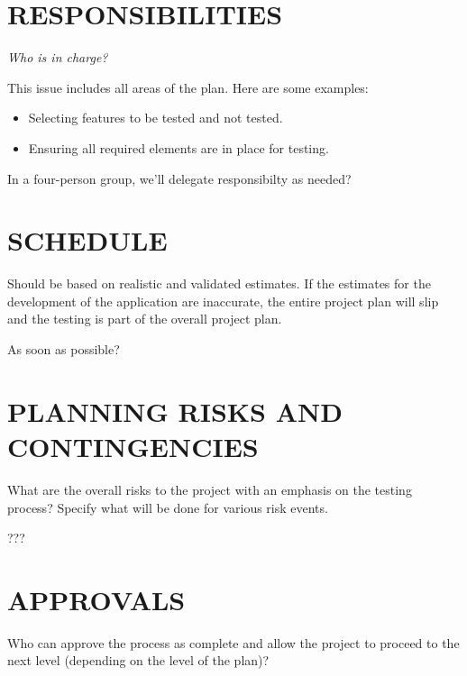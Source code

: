 \section[RESPONSIBILITIES]{\bfseries\color{black} RESPONSIBILITIES}
{\itshape\color{black}
Who is in charge?

This issue includes all areas of the plan. Here are some examples:

\begin{itemize}
\item Selecting features to be tested and not tested.
\item Ensuring all required elements are in place for testing. 
\end{itemize}
}
{\color{black}

  In a four-person group, we'll delegate responsibilty as needed?

}

\section[SCHEDULE]{\bfseries\color{black} SCHEDULE}
{\itshape\color{black}

Should be based on realistic and validated estimates. If the estimates
for the development of the application are inaccurate, the entire
project plan will slip and the testing is part of the overall project plan.

}
{\color{black}

  As soon as possible?

}

\section[PLANNING RISKS AND CONTINGENCIES]{\bfseries\color{black}
	 PLANNING RISKS AND CONTINGENCIES}
{\itshape\color{black}

What are the overall risks to the project with an emphasis on the
testing process? Specify what will be done for various risk events.

}
{\color{black}

???

}

\section[APPROVALS]{\bfseries\color{black} APPROVALS}
{\itshape\color{black}

Who can approve the process as complete and allow the project to
proceed to the next level (depending on the level of the plan)? 

}
{\color{black}

  

}

